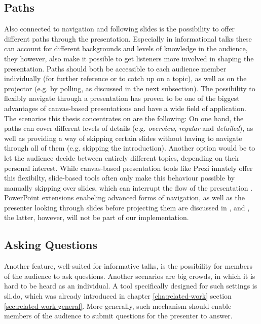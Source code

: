 \subsection{Paths}
Also connected to navigation and following slides is the possibility to offer different paths through the presentation. Especially in informational talks these can account for different backgrounds and levels of knowledge in the audience, they however, also make it possible to get listeners more involved in shaping the presentation. Paths should both be accessible to each audience member individually (for further reference or to catch up on a topic), as well as on the projector (e.g. by polling, as discussed in the next subsection).
The possibility to flexibly navigate through a presentation has proven to be one of the biggest advantages of canvas-based presentations \cite{Lichtschlag:CanvasPresentationsInTheWild} and have a wide field of application. The scenarios this thesis concentrates on are the following: On one hand, the paths can cover different levels of details (e.g. \emph{overview}, \emph{regular} and \emph{detailed}), as well as providing a way of skipping certain slides without having to navigate through all of them (e.g. skipping the introduction). Another option would be to let the audience decide between entirely different topics, depending on their personal interest. While canvas-based presentation tools like Prezi innately offer this flexibilty, slide-based tools often only make this behaviour possible by manually skipping over slides, which can interrupt the flow of the presentation \cite{Dieberger:NarrativeFlow}. PowerPoint extensions enabeling advanced forms of navigation, as well as the presenter looking through slides before projecting them are discussed in \cite{Dieberger:NarrativeFlow}, \cite{Nelson:PalettePaperInterface} and \cite{Signer:PaperPoint}, the latter, however, will not be part of our implementation.

\subsection{Asking Questions}
Another feature, well-suited for informative talks, is the possibility for members of the audience to ask questions. Another scenarios are big crowds, in which it is hard to be heard as an individual. A tool specifically designed for such settings is sli.do, which was already introduced in chapter \ref{cha:related-work} section \ref{sec:related-work-general}.
More generally, such mechanism should enable members of the audience to submit questions for the presenter to answer. 

